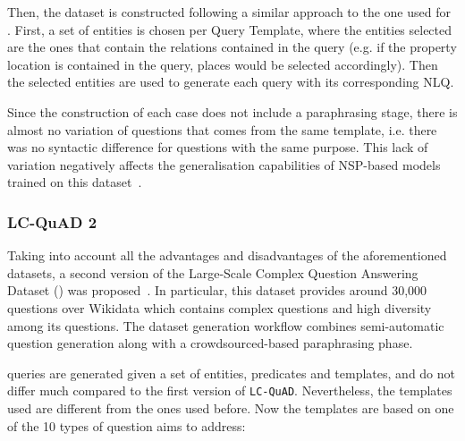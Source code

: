 Then, the dataset is constructed following a similar approach to the one used for \LCQuADone{}. 
First, a set of entities is chosen per Query Template, where the entities selected are the ones 
that contain the relations contained in the query (e.g. if the property location is contained 
in the query, places would be selected accordingly). Then the selected entities are used to 
generate each \SPARQL{} query with its corresponding NLQ. 

Since the construction of each case does not include a paraphrasing stage, there is almost no 
variation of questions that comes from the same template, i.e. there was no syntactic 
difference for questions with the same purpose. This lack of variation negatively affects the 
generalisation capabilities of NSP-based models trained on this dataset~\cite{qa:BerantL14}.

\subsubsection{LC-QuAD 2}
\label{cap2:theoFrame/qakg/benchmarkDatasets/lcquad2}
Taking into account all the advantages and disadvantages of the aforementioned datasets, a 
second version of the Large-Scale Complex Question Answering Dataset (\LCQuADtwo{}) was 
proposed~\cite{dataset:lcquad2-DubeyBA019}. In particular, this dataset provides around 30,000 
questions over Wikidata which contains complex questions and high diversity among its questions. 
The dataset generation workflow combines semi-automatic question generation along with a 
crowdsourced-based paraphrasing phase.

\SPARQL{} queries are generated given a set of entities, predicates and templates, and do not differ 
much compared to the first version of \texttt{LC-QuAD}. Nevertheless, the \SPARQL{} templates used 
are different from the ones used before. Now the templates are based on one of the 10 types of 
question \LCQuADtwo{} aims to address:

